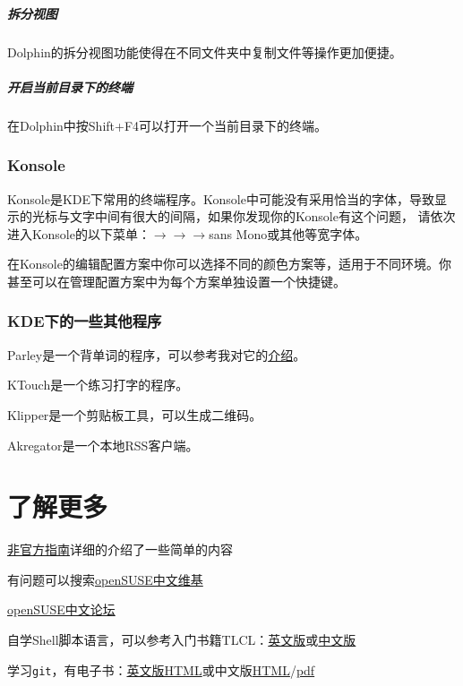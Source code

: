 \documentclass[11pt,openany]{book}
\newcommand{\soft}[1]{\texttt{\textcolor{dgreen}{#1}}}
\newcommand{\menu}[1]{\fbox{#1}}
\newcommand{\me}{$\rightarrow$}
\begin{document}
\paragraph{拆分视图} Dolphin的拆分视图功能使得在不同文件夹中复制文件等操作更加便捷。

\paragraph{开启当前目录下的终端} 在Dolphin中按Shift+F4可以打开一个当前目录下的终端。


\subsection{Konsole}
Konsole是KDE下常用的终端程序。Konsole中可能没有采用恰当的字体，导致显示的光标与文字中间有很大的间隔，如果你发现你的Konsole有这个问题，
请依次进入Konsole的以下菜单：\menu{设置}\me\menu{编辑当前方案}\me\menu{外观}\me\menu{选择
字体} sans Mono或其他等宽字体。

在Konsole的编辑配置方案中你可以选择不同的颜色方案等，适用于不同环境。你甚至可以在管理配置方案中为每个方案单独设置一个快捷键。
\subsection{KDE下的一些其他程序}
Parley是一个背单词的程序，可以参考我对它的\href{http://zpj.blog.ustc.edu.cn/?p=294}{介绍}。

KTouch是一个练习打字的程序。

Klipper是一个剪贴板工具，可以生成二维码。

Akregator是一个本地RSS客户端。
\chapter{了解更多}
\begin{compactitem}
 \item \href{https://lug.ustc.edu.cn/sites/opensuse-guide/}{非官方指南}详细的介绍了一些简单的内容
 \item 有问题可以搜索\href{https://zh.opensuse.org/%E9%A6%96%E9%A1%B5}{openSUSE中文维基}
 \item \href{https://forum.suse.org.cn/}{openSUSE中文论坛}
 \item 自学Shell脚本语言，可以参考入门书籍TLCL：\href{http://home.ustc.edu.cn/~zpj/doc/Linux/The_Linux_Command_Line.pdf}{英文版}或\href{http://home.ustc.edu.cn/~zpj/doc/Linux/The_Linux_Command_Line(%e4%b8%ad%e6%96%87%e7%89%88).pdf}{中文版}
 \item 学习\soft{git}，有电子书：\href{http://git-scm.com/book/}{英文版HTML}或中文版\href{http://git-scm.com/book/zh}{HTML}/\href{http://liam0205.me/attachment/Git/progit.zh.pdf}{pdf}
\end{compactitem}
\listoffigures
\end{document}
